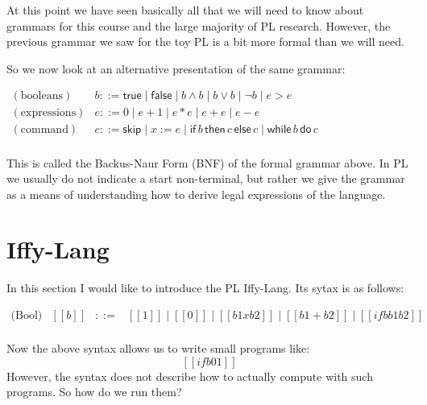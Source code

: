 \documentclass{article}
\begin{document}
At this point we have seen basically all that we will need to know
about grammars for this course and the large majority of PL research.
However, the previous grammar we saw for the toy PL is a bit more
formal than we will need.  

So we now look at an alternative presentation of the same grammar:
\begin{center}
  \begin{math}
    \begin{array}{rll}
      (\text{booleans}) & b ::= \mathsf{true} \mid \mathsf{false} \mid
      b \land b \mid b \lor b \mid \lnot b \mid e > e\\
      (\text{expressions}) & e ::= 0 \mid e+1 \mid e * e \mid e + e
      \mid e - e\\
      (\text{command}) & c ::= \mathsf{skip} \mid x := e \mid
      \mathsf{if}\,b\,\mathsf{then}\,c\,\mathsf{else}\,c \mid
      \mathsf{while}\,b\,\mathsf{do}\,c \\
    \end{array}
  \end{math}
\end{center}
This is called the Backus-Naur Form (BNF) of the formal grammar above.
In PL we usually do not indicate a start non-terminal, but rather we
give the grammar as a means of understanding how to derive legal
expressions of the language.

\section{Iffy-Lang}
\label{sec:iffy-lang}
In this section I would like to introduce the PL Iffy-Lang.  Its sytax
is as follows:
\begin{center}
  \begin{math}
    \begin{array}{lllllllll}
      \text{(Bool)}  & [[b]] & ::= & [[1]] \mid [[0]] \mid [[b1 x b2]] \mid [[b1 + b2]]
      \mid [[if b b1 b2]]\\
    \end{array}
  \end{math}
\end{center}
Now the above syntax allows us to write small programs like:
\[ [[if b 0 1]] \] 
However, the syntax does not describe how to actually compute
with such programs. So how do we run them?
\end{document}
